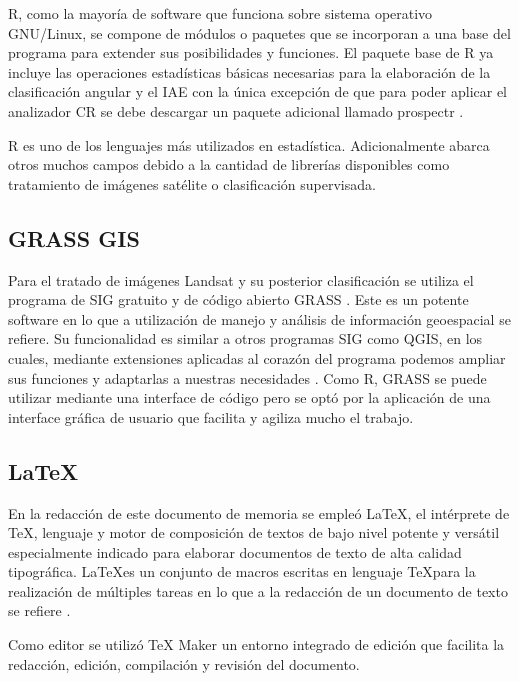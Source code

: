R, como la mayoría de software que funciona sobre sistema operativo GNU/Linux, se compone de módulos o paquetes que se incorporan a una base del programa para extender sus posibilidades y funciones. El paquete base de R ya incluye las operaciones estadísticas básicas necesarias para la elaboración de la clasificación angular y el \ac{IAE} con la única excepción de que para poder aplicar el analizador \ac{CR} se debe descargar un paquete adicional llamado prospectr \citep{stevens2014introduction}.\Sep

R es uno de los lenguajes más utilizados en estadística. Adicionalmente abarca otros muchos campos debido a la cantidad de librerías disponibles como tratamiento de imágenes satélite o clasificación supervisada.

\subsection{GRASS GIS}
Para el tratado de imágenes Landsat y su posterior clasificación se utiliza el programa de \ac{SIG} gratuito y de código abierto \ac{GRASS} \citep{GRASS_GIS_software}. Este es un potente software en lo que a utilización de manejo y análisis de información geoespacial se refiere. Su funcionalidad es similar a otros programas \ac{SIG} como QGIS, en los cuales, mediante extensiones aplicadas al corazón del programa podemos ampliar sus funciones y adaptarlas a nuestras necesidades \citep{neteler2002open}. Como R, \ac{GRASS} se puede utilizar mediante una interface de código pero se optó por la aplicación de una interface gráfica de usuario que facilita y agiliza mucho el trabajo.\Sep

\subsection{\LaTeX}
En la redacción de este documento de memoria se empleó \LaTeX, el intérprete de \TeX, lenguaje y motor de composición de textos de bajo nivel potente y versátil especialmente indicado para elaborar documentos de texto de alta calidad tipográfica. \LaTeX es un conjunto de macros escritas en lenguaje \TeX para la realización de múltiples tareas en lo que a la redacción de un documento de texto se refiere \citep{Latex2011} \citep{galindo2001} \citep{lamport1994}.\Sep

Como editor se utilizó TeX Maker \citep{Brachet2003} un entorno integrado de edición que facilita la redacción, edición, compilación y revisión del documento.\Sep

